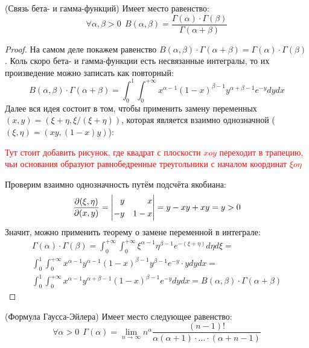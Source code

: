 \begin{theorem} (Связь бета- и гамма-функций)
	Имеет место равенство:
	\[
		\forall \alpha, \beta > 0\ \ B(\alpha, \beta) = \frac{\Gamma(\alpha) \cdot \Gamma(\beta)}{\Gamma(\alpha + \beta)}
	\]
\end{theorem}

\begin{proof}
	На самом деле покажем равенство $B(\alpha, \beta) \cdot \Gamma(\alpha + \beta) = \Gamma(\alpha) \cdot \Gamma(\beta)$. Коль скоро бета- и гамма-функции есть несвязанные интегралы, то их произведение можно записать как повторный:
	\[
		B(\alpha, \beta) \cdot \Gamma(\alpha + \beta) = \int_0^1 \int_0^{+\infty} x^{\alpha - 1}(1 - x)^{\beta - 1}y^{\alpha + \beta - 1}e^{-y}dydx
	\]
	Далее вся идея состоит в том, чтобы применить замену переменных $(x, y) = (\xi + \eta, \xi / (\xi + \eta))$, которая является взаимно однозначной ($(\xi, \eta) = (xy, (1 - x)y)$):
	
	\textcolor{red}{Тут стоит добавить рисунок, где квадрат с плоскости $xoy$ переходит в трапецию, чьи основания образуют равнобедренные треугольники с началом координат $\xi o \eta$}
	
	Проверим взаимно однозначность путём подсчёта якобиана:
	\[
		\frac{\partial (\xi, \eta)}{\partial (x, y)} = \left| \begin{aligned} 
			y& &x
			\\
			-y& &1 - x
		 \end{aligned} \right| = y - xy + xy = y > 0
	\]
	Значит, можно применить теорему о замене переменной в интеграле:
	\begin{multline*}
		\Gamma(\alpha) \cdot \Gamma(\beta) = \int_0^{+\infty} \int_0^{+\infty} \xi^{\alpha - 1} \eta^{\beta - 1} e^{-(\xi + \eta)}d\eta d\xi =
		\\
		\int_0^1 \int_0^{+\infty} x^{\alpha - 1} y^{\alpha - 1} (1 - x)^{\beta - 1} y^{\beta - 1} e^{-y} \cdot ydydx =
		\\
		\int_0^1 \int_0^{+\infty} x^{\alpha - 1} y^{\alpha + \beta - 1} (1 - x)^{\beta - 1} e^{-y} dydx = B(\alpha, \beta) \cdot \Gamma(\alpha + \beta)
	\end{multline*}
\end{proof}

\begin{theorem} (Формула Гаусса-Эйлера)
	Имеет место следующее равенство:
	\[
		\forall \alpha > 0\ \ \Gamma(\alpha) = \lim_{n \to \infty} n^\alpha \frac{(n - 1)!}{\alpha(\alpha + 1) \cdot \ldots \cdot (\alpha + n - 1)}
	\]
\end{theorem}

